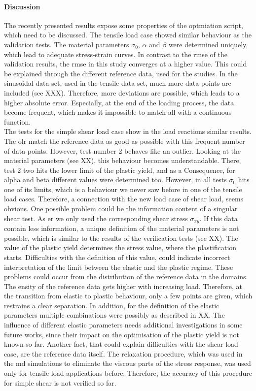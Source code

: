 \paragraph{Discussion}
The recently presented results expose some properties of the optmiation script, which need to be discussed. The tensile load case showed similar behaviour as the validation tests. The material parameters $\sigma_0$, $\alpha$ and $\beta$ were determined uniquely, which lead to adequate stress-strain curves. In contrast to the \acrshort{rmse} of the validation results, the \acrshort{rmse} in this study converges at a higher value. This could be explained through the different reference data, used for the studies. In the sinusoidal data set, used in the tensile data set, much more data points are included (see XXX). Therefore, more deviations are possible, which leads to a higher absolute error. Especially, at the end of the loading process, the data become frequent, which makes it impossible to match all with a continuous function. \\
The tests for the simple shear load case show in the load reactions similar results. The \acrlong{olr} match the reference data as good as possible with this frequent number of data points. However, test number 2 behaves like an outlier. Looking at the material parameters (see XX), this behaviour becomes understandable. There, test 2 two hits the lower limit of the plastic yield, and as a Consequence, for alpha and beta different values were determined too. However, in all tests $\sigma_0$ hits one of its limits, which is a behaviour we never saw before in one of the tensile load cases. Therefore, a connection with the new load case of shear load, seems obvious. One possible problem could be the information content of a singular shear test. As \acrlong{er} we only used the corresponding shear stress $\sigma_{xy}$. If this data contain less information, a unique definition of the material parameters is not possible, which is similar to the results of the verification tests (see XX). The value of the plastic yield determines the stress value, where the plastification starts. Difficulties with the definition of this value, could indicate incorrect interpretation of the limit between the elastic and the plastic regime. These problems could occur from the distribution of the reference data in the domains. The ensity of the reference data gets higher with increasing load. Therefore, at the transition from elastic to plastic behaviour, only a few points are given, which restrains a clear separation. In addition, for the definition of the elastic parameters multiple combinations were possibly as described in XX. The influence of different elastic parameters needs additional investigations in some future works, since their impact on the optimisation of the plastic yield is not known so far. Another fact, that could explain difficulties with the shear load case, are the reference data itself. The relaxation procedure, which was used in the \acrshort{md} simulations to eliminate the viscous parts of the stress response, was used only for tensile load applications before. Therefore, the accuracy of this procedure for simple shear is not verified so far. 

